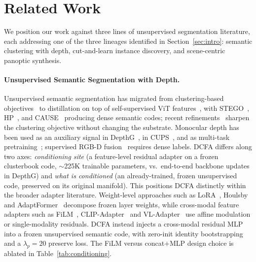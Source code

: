 \documentclass{article}
\begin{document}
\FloatBarrier
\section{Related Work}
\label{sec:related}

We position our work against three lines of unsupervised segmentation literature, each addressing one of the three lineages identified in Section~\ref{sec:intro}: semantic clustering with depth, cut-and-learn instance discovery, and scene-centric panoptic synthesis.

\paragraph{Unsupervised Semantic Segmentation with Depth.}
Unsupervised semantic segmentation has migrated from clustering-based objectives~\cite{ji2019iic,cho2021picie} to distillation on top of self-supervised ViT features~\cite{caron2021dino,oquab2024dinov2}, with STEGO~\cite{hamilton2022stego}, HP~\cite{seong2023hp}, and CAUSE~\cite{kim2024cause} producing dense semantic codes; recent refinements~\cite{kim2024eagle,seong2024ppap,couairon2024diffcut,bonnet2024hierarchy} sharpen the clustering objective without changing the substrate. Monocular depth has been used as an auxiliary signal in DepthG~\cite{sick2024depthg}, in CUPS~\cite{hahn2025cups}, and as multi-task pretraining~\cite{hoyer2021threeways}; supervised RGB-D fusion~\cite{yin2025dformerv2} requires dense labels. DCFA differs along two axes: \emph{conditioning site} (a feature-level residual adapter on a frozen clusterbook code, $\sim$225K trainable parameters, vs.\ end-to-end backbone updates in DepthG) and \emph{what is conditioned} (an already-trained, frozen unsupervised code, preserved on its original manifold). This positions DCFA distinctly within the broader adapter literature. Weight-level approaches such as LoRA~\cite{hu2022lora}, Houlsby~\cite{houlsby2019adapter} and AdaptFormer~\cite{chen2022adaptformer} decompose frozen layer weights, while cross-modal feature adapters such as FiLM~\cite{perez2018film}, CLIP-Adapter~\cite{gao2023clipadapter} and VL-Adapter~\cite{sung2022vladapter} use affine modulation or single-modality residuals. DCFA instead injects a cross-modal residual MLP into a frozen unsupervised semantic code, with zero-init identity bootstrapping and a $\lambda_p{=}20$ preserve loss. The FiLM versus concat$+$MLP design choice is ablated in Table~\ref{tab:conditioning}.
\end{document}
